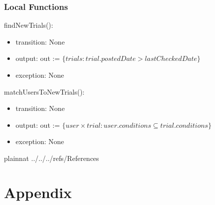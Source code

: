 \documentclass[12pt, titlepage]{article}
\begin{document}
\subsubsection{Local Functions}
\noindent findNewTrials():
\begin{itemize}
\item transition: None
\item output: out := $\{trials : trial.postedDate > lastCheckedDate\}$
\item exception: None
\end{itemize}

\noindent matchUsersToNewTrials():
\begin{itemize}
\item transition: None
\item output: out := $\{user \times trial : user.conditions \subseteq trial.conditions\}$
\item exception: None
\end{itemize}



\newpage

 {plainnat}
 {../../../refs/References}

\newpage

\section{Appendix} \label{Appendix}

\end{document}
